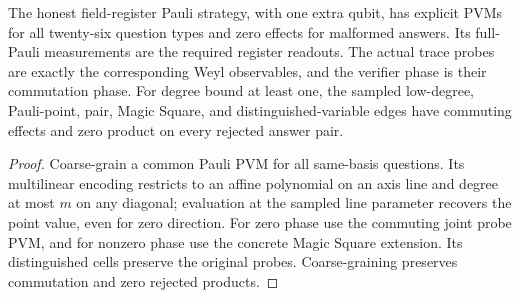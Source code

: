 \begin{lemma}
\label{lem:intro-honest-pauli-measurements}
\leanok
The honest field-register Pauli strategy, with one extra qubit, has explicit
PVMs for all twenty-six question types and zero effects for malformed
answers. Its full-Pauli measurements are the required register readouts.
The actual trace probes are exactly the corresponding Weyl observables,
and the verifier phase is their commutation phase. For degree bound at
least one, the sampled low-degree, Pauli-point, pair, Magic Square, and
distinguished-variable edges have commuting effects and zero product on
every rejected answer pair.
\end{lemma}
\begin{proof}
\leanok
Coarse-grain a common Pauli PVM for all same-basis questions. Its
multilinear encoding restricts to an affine polynomial on an axis line and
degree at most $m$ on any diagonal; evaluation at the sampled line parameter
recovers the point value, even for zero direction. For zero phase use the
commuting joint probe PVM, and for nonzero phase use the concrete Magic
Square extension. Its distinguished cells preserve the original probes.
Coarse-graining preserves commutation and zero rejected products.
\end{proof}

